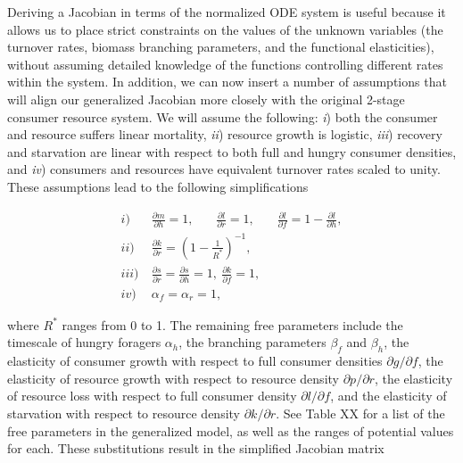 \documentclass[12pt,english]{article}
\begin{document}
\begin{spacing}{1.9}
Deriving a Jacobian in terms of the normalized ODE system is useful because it allows us to place strict constraints on the values of the unknown variables (the turnover rates, biomass branching parameters, and the functional elasticities), without assuming detailed knowledge of the functions controlling different rates within the system. %
In addition, we can now insert a number of assumptions that will align our generalized Jacobian more closely with the original 2-stage consumer resource system.
We will assume the following:
\emph{i}) both the consumer and resource suffers linear mortality,
\emph{ii}) resource growth is logistic,
\emph{iii}) recovery and starvation are linear with respect to both full and hungry consumer densities, and
\emph{iv}) consumers and resources have equivalent turnover rates scaled to unity.
These assumptions lead to the following simplifications

\begin{align}
	i)~&\frac{\partial m}{\partial h} = 1, ~~~~~~~~ \frac{\partial l}{\partial r} = 1, ~~~~~~~~ \frac{\partial l}{\partial f} = 1 - \frac{\partial l}{\partial h}, \nonumber \\
	ii)~&\frac{\partial k}{\partial r} = \left(1 - \frac{1}{R^*} \right)^{-1}, \nonumber \\
	iii)~&\frac{\partial s}{\partial r} = \frac{\partial s}{\partial h} = 1, ~ \frac{\partial k}{\partial f} = 1, \nonumber \\
	iv)~&\alpha_f = \alpha_r = 1,
\end{align}

\noindent where $R^*$ ranges from 0 to 1.
The remaining free parameters include the timescale of hungry foragers $\alpha_h$, the branching parameters $\beta_f$ and $\beta_h$, the elasticity of consumer growth with respect to full consumer densities $\partial g / \partial f$, the elasticity of resource growth with respect to resource density $\partial p / \partial r$, the elasticity of resource loss with respect to full consumer density $\partial l / \partial f$, and the elasticity of starvation with respect to resource density $\partial k / \partial r$.
See Table XX for a list of the free parameters in the generalized model, as well as the ranges of potential values for each.
These substitutions result in the simplified Jacobian matrix


\end{spacing}
\end{document}

